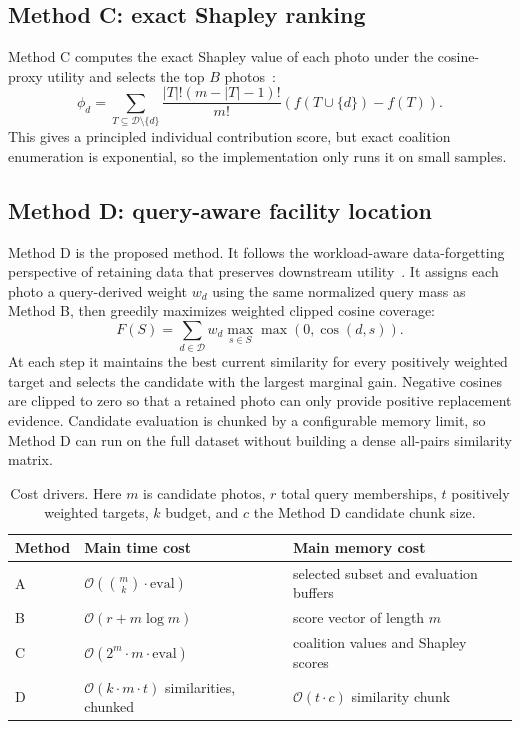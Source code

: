 \documentclass[sigconf,nonacm]{acmart}
\newcommand{\dataset}{\mathcal{D}}
\newcommand{\budget}{B}
\newcommand{\cosim}{\operatorname{cos}}
\begin{document}
\subsection{Method C: exact Shapley ranking}
Method C computes the exact Shapley value of each photo under the cosine-proxy utility and selects the top $\budget$ photos~\cite{shapley1953value}:
\begin{equation}
  \phi_d =
  \sum_{T \subseteq \dataset \setminus \{d\}}
  \frac{|T|!(m-|T|-1)!}{m!}
  \left(f(T \cup \{d\}) - f(T)\right).
  \label{eq:shapley}
\end{equation}
This gives a principled individual contribution score, but exact coalition enumeration is exponential, so the implementation only runs it on small samples.

\subsection{Method D: query-aware facility location}
Method D is the proposed method. It follows the workload-aware data-forgetting perspective of retaining data that preserves downstream utility~\cite{rico2026stochastic}. It assigns each photo a query-derived weight $w_d$ using the same normalized query mass as Method B, then greedily maximizes weighted clipped cosine coverage:
\begin{equation}
  F(S) =
  \sum_{d \in \dataset}
  w_d \max_{s \in S} \max(0, \cosim(d, s)).
  \label{eq:facility}
\end{equation}
At each step it maintains the best current similarity for every positively weighted target and selects the candidate with the largest marginal gain. Negative cosines are clipped to zero so that a retained photo can only provide positive replacement evidence. Candidate evaluation is chunked by a configurable memory limit, so Method D can run on the full dataset without building a dense all-pairs similarity matrix.

\begin{table}[!htbp]
  \centering
  \caption{Cost drivers. Here $m$ is candidate photos, $r$ total query memberships, $t$ positively weighted targets, $k$ budget, and $c$ the Method D candidate chunk size.}
  \label{tab:complexity}
  \small
  \begin{tabularx}{\textwidth}{@{}lYY@{}}
    \toprule
    Method & Main time cost & Main memory cost \\
    \midrule
    A & $\mathcal{O}\!\left(\binom{m}{k}\cdot\mathrm{eval}\right)$ & selected subset and evaluation buffers \\
    B & $\mathcal{O}(r + m\log m)$ & score vector of length $m$ \\
    C & $\mathcal{O}(2^m\cdot m\cdot\mathrm{eval})$ & coalition values and Shapley scores \\
    D & $\mathcal{O}(k\cdot m\cdot t)$ similarities, chunked & $\mathcal{O}(t\cdot c)$ similarity chunk \\
    \bottomrule
  \end{tabularx}
\end{table}
\end{document}
